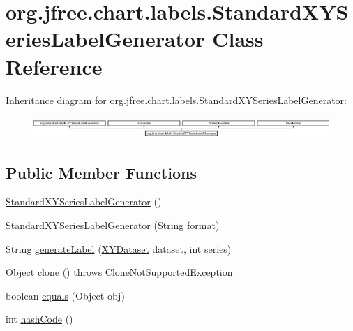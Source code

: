 \hypertarget{classorg_1_1jfree_1_1chart_1_1labels_1_1_standard_x_y_series_label_generator}{}\section{org.\+jfree.\+chart.\+labels.\+Standard\+X\+Y\+Series\+Label\+Generator Class Reference}
\label{classorg_1_1jfree_1_1chart_1_1labels_1_1_standard_x_y_series_label_generator}
Inheritance diagram for org.\+jfree.\+chart.\+labels.\+Standard\+X\+Y\+Series\+Label\+Generator\+:\begin{figure}[H]
\begin{center}
\leavevmode
\includegraphics[height=0.833333cm]{classorg_1_1jfree_1_1chart_1_1labels_1_1_standard_x_y_series_label_generator}
\end{center}
\end{figure}
\subsection*{Public Member Functions}
\begin{DoxyCompactItemize}
\item 
\mbox{\hyperlink{classorg_1_1jfree_1_1chart_1_1labels_1_1_standard_x_y_series_label_generator_ac776d17a7c4d8a8794e78a6f55dd91e6}{Standard\+X\+Y\+Series\+Label\+Generator}} ()
\item 
\mbox{\hyperlink{classorg_1_1jfree_1_1chart_1_1labels_1_1_standard_x_y_series_label_generator_a3b65c771b99039d2033254d6f82812a1}{Standard\+X\+Y\+Series\+Label\+Generator}} (String format)
\item 
String \mbox{\hyperlink{classorg_1_1jfree_1_1chart_1_1labels_1_1_standard_x_y_series_label_generator_a375c362db86e54c4d8180f21f18f4ffb}{generate\+Label}} (\mbox{\hyperlink{interfaceorg_1_1jfree_1_1data_1_1xy_1_1_x_y_dataset}{X\+Y\+Dataset}} dataset, int series)
\item 
Object \mbox{\hyperlink{classorg_1_1jfree_1_1chart_1_1labels_1_1_standard_x_y_series_label_generator_a4ffadba190eefa086c57c6a20f979348}{clone}} ()  throws Clone\+Not\+Supported\+Exception 
\item 
boolean \mbox{\hyperlink{classorg_1_1jfree_1_1chart_1_1labels_1_1_standard_x_y_series_label_generator_ae59acaaf79ccd9cf931f0ab2c63bb234}{equals}} (Object obj)
\item 
int \mbox{\hyperlink{classorg_1_1jfree_1_1chart_1_1labels_1_1_standard_x_y_series_label_generator_aa2337896b2c4167e958c74c62f27b20a}{hash\+Code}} ()
\end{DoxyCompactItemize}
